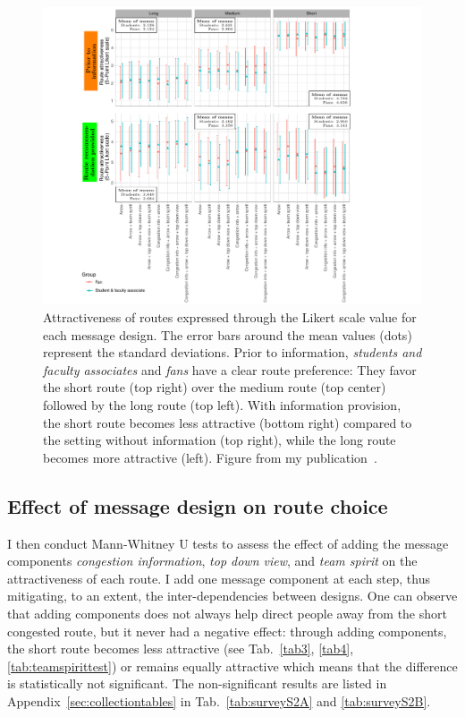 \begin{figure}[hbt!]
\includegraphics[width=\textwidth,trim={1.8cm 0cm 3.4cm 0cm},clip]{figures/investigation/Nachrichtengestaltung/qoI.pdf} \caption[Attractiveness of routes expressed through the Likert scale value assigned by participants]{ Attractiveness of routes expressed through the Likert scale value for each message design.  The error bars around the mean values (dots) represent the standard deviations. 
Prior to information, \textit{students and faculty associates} and \textit{fans} have a clear route preference: They favor the short route (top right) over the medium route (top center) followed by the long route (top left). With information provision, the short route becomes less attractive (bottom right) compared to the setting without information (top right), while the long route becomes more attractive (left). Figure from my publication~\cite{mayr-2023-cdyn}. }
\label{fig4}
\end{figure}

\FloatBarrier





\subsection{Effect of message design on route choice}

I then conduct Mann-Whitney U tests to assess the effect of adding the message components \textit{congestion information}, \textit{top down view}, and \textit{team spirit} on the attractiveness of each route. I add one message component at each step, thus mitigating, to an extent, the inter-dependencies between designs. One can observe that adding components does not always help direct people away from the short congested route, but it never had a negative effect: 
through adding components, the short route becomes less attractive (see Tab.~\ref{tab3}, \ref{tab4}, \ref{tab:teamspirittest}) or remains equally attractive which means that the difference is statistically not significant. The non-significant results are listed in Appendix~\ref{sec:collectiontables} in Tab.~\ref{tab:surveyS2A} and \ref{tab:surveyS2B}. 

